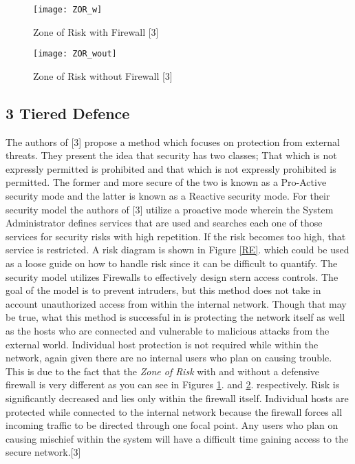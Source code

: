 \documentclass[11pt,onecolumn,cspaper,compsoc]{IEEEtran}
\begin{document}
\begin{figure}[!ht]
  \centering
  \texttt{[image: ZOR\_w]}
  \caption{Zone of Risk with Firewall [3]}
  \label{zorw}
\end{figure}

\begin{figure}[!ht]
  \centering
  \texttt{[image: ZOR\_wout]}
  \caption{Zone of Risk without Firewall [3]}
  \label{zorwo}
\end{figure}

\subsection{3 Tiered Defence}

The authors of [3] propose a method which focuses on protection from external threats. They present the idea that security has two classes; 
That which is not expressly permitted is prohibited and that which is not expressly prohibited is permitted. The former and more secure 
of the two is known as a Pro-Active security mode and the latter is known as a Reactive security mode. For their security model the authors 
of [3] utilize a proactive mode wherein the System Administrator defines services that are used and searches each one of those services for 
security risks with high repetition. If the risk becomes too high, that service is restricted. A risk diagram is shown in Figure 
\ref{RE}. which could be used as a loose guide on how to handle risk since it can be difficult to quantify. The security model utilizes Firewalls to 
effectively design stern access controls. The goal of the model is to prevent intruders, but this method does not take in account unauthorized 
access from within the internal network. Though that may be true, what this method is successful in is protecting the network itself as well 
as the hosts who are connected and vulnerable to malicious attacks from the external world. Individual host protection is not required while 
within the network, again given there are no internal users who plan on causing trouble. This is due to the fact that the \textit{Zone of Risk} 
with and without a defensive firewall is very different as you can see in Figures \ref{zorw}. and \ref{zorwo}. respectively. Risk is 
significantly decreased and lies only within the firewall itself. Individual hosts are protected while connected to the internal network 
because the firewall forces all incoming traffic to be directed through one focal point. Any users who plan on causing mischief within the 
system will have a difficult time gaining access to the secure network.[3] 
\end{document}

